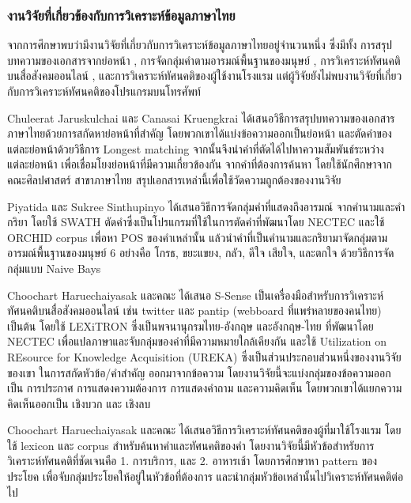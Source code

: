 \subsubsection{งานวิจัยที่เกี่ยวข้องกับการวิเคราะห์ข้อมูลภาษาไทย}
จากการศึกษาพบว่ามีงานวิจัยที่เกี่ยวกับการวิเคราะห์ข้อมูลภาษาไทยอยู่จำนวนหนึ่ง ซึ่งมีทั้ง การสรุปบทความของเอกสารจากย่อหน้า \cite{paragraphextract}, การจัดกลุ่มคำตามอารมณ์พื้นฐานของมนุษย์ \cite{emotioninthai}, การวิเคราะห์ทัศนคติบนสื่อสังคมออนไลน์ \cite{ssense}, และการวิเคราะห์ทัศนคติของผู้ใช้งานโรงแรม \cite{thaiopinionmininghotel} แต่ผู้วิจัยยังไม่พบงานวิจัยที่เกี่ยวกับการวิเคราะห์ทัศนคติของโปรแกรมบนโทรศัพท์

Chuleerat Jaruskulchai และ Canasai Kruengkrai \cite{paragraphextract} ได้เสนอวิธีการสรุปบทความของเอกสารภาษาไทยด้วยการสกัดหาย่อหน้าที่สำคัญ โดยพวกเขาได้แบ่งข้อความออกเป็นย่อหน้า และตัดคำของแต่ละย่อหน้าด้วยวิธีการ Longest matching จากนั้นจึงนำคำที่ตัดได้ไปหาความสัมพันธ์ระหว่างแต่ละย่อหน้า เพื่อเชื่อมโยงย่อหน้าที่มีความเกี่ยวข้องกัน จากคำที่ต้องการค้นหา โดยใช้นักศึกษาจากคณะศิลปศาสตร์ สาขาภาษาไทย สรุปเอกสารเหล่านี้เพื่อใช้วัดความถูกต้องของงานวิจัย

Piyatida และ Sukree Sinthupinyo \cite{emotioninthai} ได้เสนอวิธีการจัดกลุ่มคำที่แสดงถึงอารมณ์ จากคำนามและคำกริยา โดยใช้ SWATH ตัดคำซึ่งเป็นโปรแกรมที่ใช้ในการตัดคำที่พัฒนาโดย NECTEC และใช้ ORCHID corpus เพื่อหา POS ของคำเหล่านั้น แล้วนำคำที่เป็นคำนามและกริยามาจัดกลุ่มตามอารมณ์พื้นฐานของมนุษย์ 6 อย่างคือ โกรธ, ขยะแขยง, กลัว, ดีใจ เสียใจ, และตกใจ \cite{basicemotion} ด้วยวิธีการจัดกลุ่มแบบ Naive Bays 

Choochart Haruechaiyasak และคณะ \cite{ssense} ได้เสนอ S-Sense เป็นเครื่องมือสำหรับการวิเคราะห์ทัศนคติบนสื่อสังคมออนไลน์ เช่น twitter และ pantip (webboard ที่แพร่หลายของคนไทย) เป็นต้น โดยใช้ LEXiTRON ซึ่งเป็นพจนานุกรมไทย-อังกฤษ และอังกฤษ-ไทย ที่พัฒนาโดย NECTEC เพื่อแปลภาษาและจับกลุ่มของคำที่มีความหมายใกล้เคียงกัน และใช้ Utilization on REsource for Knowledge Acquisition (UREKA) ซึ่งเป็นส่วนประกอบส่วนหนึ่งของงานวิจัยของเขา ในการสกัดหัวข้อ/คำสำคัญ ออกมาจากข้อความ โดยงานวิจัยนี้จะแบ่งกลุ่มของข้อความออกเป็น การประกาศ การแสดงความต้องการ การแสดงคำถาม และความคิดเห็น โดยพวกเขาได้แยกความคิดเห็นออกเป็น เชิงบวก และ เชิงลบ

Choochart Haruechaiyasak และคณะ \cite{thaiopinionmininghotel} ได้เสนอวิธีการวิเคราะห์ทัศนคติของผู้ที่มาใช้โรงแรม โดยใช้ lexicon และ corpus สำหรับค้นหาคำและทัศนคติของคำ โดยงานวิจัยนี้มีหัวข้อสำหรัยการวิเคราะห์ทัศนคติที่ชัดเจนคือ 1. การบริการ, และ 2. อาหารเช้า โดยการศึกษาหา pattern ของประโยค เพื่อจับกลุ่มประโยคให้อยู่ในหัวข้อที่ต้องการ และนำกลุ่มหัวข้อเหล่านั้นไปวิเคราะห์ทัศนคติต่อไป

